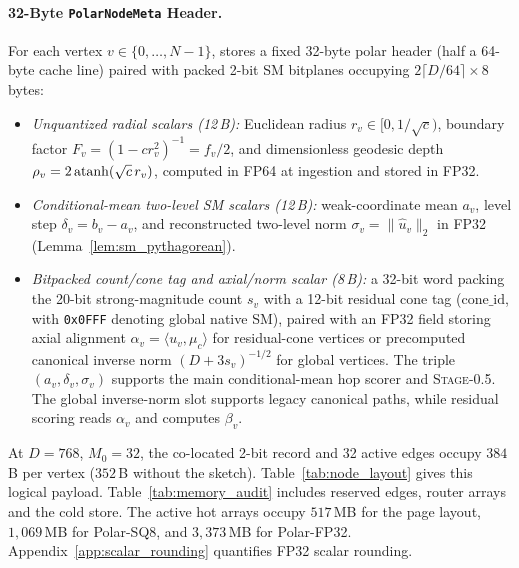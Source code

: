 \paragraph{32-Byte \texttt{PolarNodeMeta} Header.}
For each vertex $v \in \{0, \dots, N-1\}$, \rquiver{} stores a fixed 32-byte polar header (half a 64-byte cache line) paired with packed 2-bit {SM} bitplanes occupying $2\lceil D / 64\rceil \times 8$ bytes:
\begin{itemize}
  \item \emph{Unquantized radial scalars (12\,B):} Euclidean radius $r_v \in [0, 1/\sqrt{c})$, boundary factor $F_v=(1-cr_v^2)^{-1}=f_v/2$, and dimensionless geodesic depth $\rho_v = 2\operatorname{atanh}(\sqrt{c}\,r_v)$, computed in FP64 at ingestion and stored in FP32.
  \item \emph{Conditional-mean two-level {SM} scalars (12\,B):} weak-coordinate mean $a_v$, level step $\delta_v = b_v - a_v$, and reconstructed two-level norm $\sigma_v = \|\hat{u}_v\|_2$ in FP32 (Lemma~\ref{lem:sm_pythagorean}).
  \item \emph{Bitpacked count/cone tag and axial/norm scalar (8\,B):} a 32-bit word packing the 20-bit strong-magnitude count $s_v$ with a 12-bit residual cone tag ($\text{cone\_id}$, with \texttt{0x0FFF} denoting global native {SM}), paired with an FP32 field storing axial alignment $\alpha_v = \langle u_v, \mu_c\rangle$ for residual-cone vertices or precomputed canonical inverse norm $(D+3s_v)^{-1/2}$ for global vertices. The triple $(a_v,\delta_v,\sigma_v)$ supports the main conditional-mean hop scorer and \textsc{Stage-0.5}. The global inverse-norm slot supports legacy canonical paths, while residual scoring reads $\alpha_v$ and computes $\beta_v$.
\end{itemize}
At $D=768$, $M_0=32$, the co-located 2-bit record and 32 active edges occupy $384$\,B per vertex ($352$\,B without the sketch). Table~\ref{tab:node_layout} gives this logical payload. Table~\ref{tab:memory_audit} includes reserved edges, router arrays and the cold store. The active hot arrays occupy $517$\,MB for the page layout, $1{,}069$\,MB for {Polar-SQ8}, and $3{,}373$\,MB for {Polar-FP32}. Appendix~\ref{app:scalar_rounding} quantifies FP32 scalar rounding.

